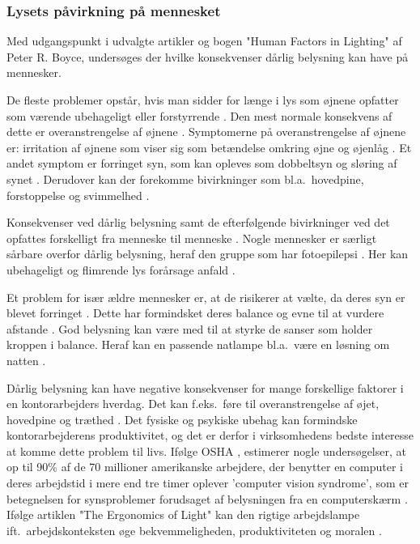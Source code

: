 \subsubsection{Lysets påvirkning på mennesket} 
\label{sec:konsekvenser}

Med udgangspunkt i udvalgte artikler og bogen "Human Factors in Lighting" af Peter R. Boyce, undersøges der hvilke konsekvenser dårlig belysning kan have på mennesker. 

De fleste problemer opstår, hvis man sidder for længe i lys som øjnene opfatter som værende ubehageligt eller forstyrrende \cite{human_factors}. Den mest normale konsekvens af dette er overanstrengelse af øjnene \cite{human_factors}. Symptomerne på overanstrengelse af øjnene er: irritation af øjnene som viser sig som betændelse omkring øjne og øjenlåg \cite{human_factors}. Et andet symptom er forringet syn, som kan opleves som dobbeltsyn og sløring af synet \cite{human_factors}. Derudover kan der forekomme bivirkninger som bl.a.\ hovedpine, forstoppelse og svimmelhed \cite{human_factors}.

Konsekvenser ved dårlig belysning samt de efterfølgende bivirkninger ved det opfattes forskelligt fra menneske til menneske \cite{human_factors}. Nogle mennesker er særligt sårbare overfor dårlig belysning, heraf den gruppe som har fotoepilepsi \cite{human_factors}. Her kan ubehageligt og flimrende lys forårsage anfald \cite{human_factors}. 

Et problem for især ældre mennesker er, at de risikerer at vælte, da deres syn er blevet forringet \cite{human_factors}. Dette har formindsket deres balance og evne til at vurdere afstande \cite{human_factors}. God belysning kan være med til at styrke de sanser som holder kroppen i balance. Heraf kan en passende natlampe bl.a.\ være en løsning om natten \cite{human_factors}. 

Dårlig belysning kan have negative konsekvenser for mange forskellige faktorer i en kontorarbejders hverdag. Det kan f.eks.\ føre til overanstrengelse af øjet, hovedpine og træthed \cite{ergonomi_arbejdsplads}. Det fysiske og psykiske ubehag kan formindske kontorarbejderens produktivitet, og det er derfor i virksomhedens bedste interesse at komme dette problem til livs. Ifølge OSHA \cite{ergonomi_arbejdsplads}, estimerer nogle undersøgelser, at op til 90\% af de 70 millioner amerikanske arbejdere, der benytter en computer i deres arbejdstid i mere end tre timer oplever 'computer vision syndrome', som er betegnelsen for synsproblemer forudsaget af belysningen fra en computerskærm \cite{CVS}. Ifølge artiklen "The Ergonomics of Light" kan den rigtige arbejdslampe ift.\ arbejdskonteksten øge bekvemmeligheden, produktiviteten og moralen \cite{ergonomi_arbejdsplads}. 